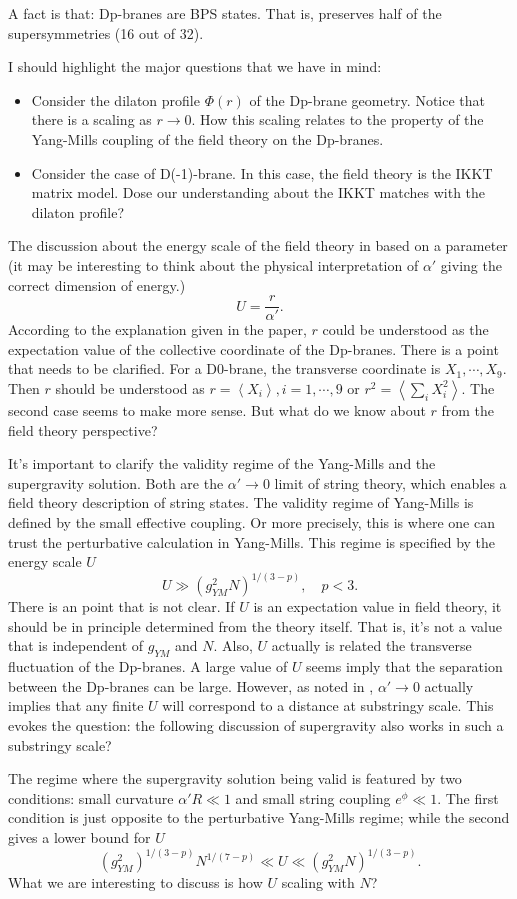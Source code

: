 \newpage
A fact is that: Dp-branes are BPS states.
That is, preserves half of the supersymmetries (16 out of 32).

\begin{correct}
I should highlight the major questions that we have in mind:
\begin{itemize}
	\item Consider the dilaton profile $\Phi(r)$ of the Dp-brane geometry.
		Notice that there is a scaling as $r\to 0$.
		How this scaling relates to the property of the Yang-Mills coupling of the field theory on the Dp-branes.
	\item Consider the case of D(-1)-brane.
		In this case, the field theory is the IKKT matrix model.
		Dose our understanding about the IKKT matches with the dilaton profile?
\end{itemize}
\end{correct}

The discussion about the energy scale of the field theory in
based on a parameter (it may be interesting to think about the physical interpretation of $\alpha'$ giving the correct dimension of energy.)
\[
U = \frac{r}{\alpha'}
.\] 
According to the explanation given in the paper,
$r$ could be understood as 
the expectation value of the collective coordinate of the Dp-branes.
There is a point that needs to be clarified.
For a D0-brane, the transverse coordinate is $X_1,\cdots,X_9$.
Then $r$ should be understood as $r = \left<X_i \right>,i=1,\cdots,9$
or $r^2 = \left<\sum_i X_i^2 \right>$.
The second case seems to make more sense.
But what do we know about $r$ from the field theory perspective?

It's important to clarify the validity regime of the Yang-Mills and the supergravity solution.
Both are the $\alpha'\to 0$ limit of string theory, which enables a field theory description of string states.
The validity regime of Yang-Mills is defined by the small effective coupling.
Or more precisely, this is where one can trust the perturbative calculation in Yang-Mills.
This regime is specified by the energy scale $U$
\[
	U \gg (g_{YM}^2 N)^{1 / (3-p)},\quad p<3
.\] 
There is an point that is not clear.
If $U$ is an expectation value in field theory,
it should be in principle determined from the theory itself.
That is, it's not a value that is independent of $g_{YM}$ and $N$.
Also, $U$ actually is related the transverse fluctuation of the Dp-branes.
A large value of $U$ seems imply that the separation between the Dp-branes can be large.
However, as noted in , $\alpha'\to 0$ actually implies that
any finite $U$ will correspond to a distance at substringy scale.
This evokes the question: the following discussion of supergravity also works in such a substringy scale?

The regime where the supergravity solution being valid is featured by two conditions: small curvature $\alpha' R \ll 1$ and small string coupling $e^\phi \ll 1$.
The first condition is just opposite to the perturbative Yang-Mills regime;
while the second gives a lower bound for $U$
\[
	(g_{YM}^2)^{1 / (3-p)} N^{1 / (7-p)} \ll U \ll (g_{YM}^2 N)^{1 / (3-p)}
.\] 
What we are interesting to discuss is how $U$ scaling with $N$?
